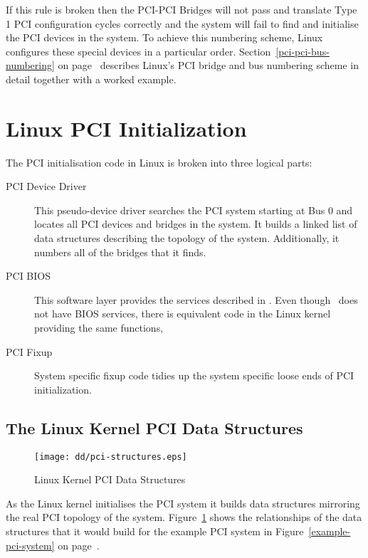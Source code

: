 If this rule is broken then the PCI-PCI Bridges will not pass and
translate Type 1 PCI configuration cycles correctly and the system will
fail to find and initialise the PCI devices in the system.
To achieve this numbering scheme, Linux configures these special devices 
in a particular order.   
Section~\ref{pci-pci-bus-numbering} on page~\pageref{pci-pci-bus-numbering}
describes Linux's PCI bridge and bus numbering scheme in detail together
with a worked example.

\section{Linux PCI Initialization}
The PCI initialisation code in Linux is broken into three logical parts:
\begin{description}
	\item [PCI Device Driver] This pseudo-device driver searches the
		PCI system starting at Bus 0 and locates all PCI
		devices and bridges in the system.  
		It builds a linked list of data structures describing the 
		topology of the system.
		Additionally, it numbers all of the bridges that it finds.
	\item [PCI BIOS] This software layer provides the services
		described in \cite[PCI BIOS ROM specification]
		{bib-pci-bios-specification}.  Even though \axp\ does
		not have BIOS services, there is equivalent code in the Linux
		kernel providing the same functions,
	\item [PCI Fixup] System specific fixup code tidies up the
		system specific loose ends of PCI initialization.
\end{description}

\subsection{The Linux Kernel PCI Data Structures}
\begin{figure}
\begin{center}
{\centering \texttt{[image: dd/pci-structures.eps]} \par}
\end{center}
\caption{Linux Kernel PCI Data Structures}
\label{pci-data-structures}
\end{figure}
As the Linux kernel initialises the PCI system it builds data structures mirroring
the real PCI topology of the system.
Figure~\ref{pci-data-structures} shows the relationships of the data structures
that it would build for the example PCI system in Figure~\ref{example-pci-system}
on page~\pageref{example-pci-system}.

